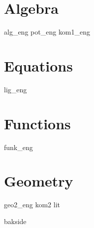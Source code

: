 \chapter{Algebra}
\newpage
{alg_eng}
{pot_eng}
\newpage
{kom1_eng}

\chapter{Equations \label{Likningar}}
\newpage
{lig_eng}

\chapter{Functions \label{Funksjoner}}
{funk_eng}

\chapter{Geometry}
\newpage
{geo2_eng}
\newpage
{kom2}
{lit}
{\printindex {}
	}
{bakside}













